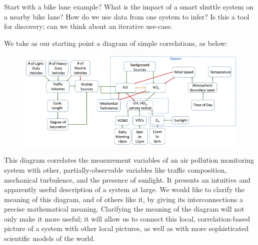 \documentclass{article}
\theoremstyle{definition}
\begin{document}
Start with a bike lane example? What is the impact of a smart shuttle system on a nearby bike lane? How do we use data from one system to infer? Is this a tool for discovery; can we think about an iterative use-case.

We take as our starting point a diagram of simple correlations, as below:

\begin{figure}[h]
\includegraphics[width=\linewidth]{portland}
\end{figure}

This diagram correlates the measurement variables of an air pollution monitoring system with other, partially-observable variables like traffic composition, mechanical turbulence, and the presence of sunlight. It presents an intuitive and apparently useful description of a system at large. We would like to clarify the meaning of this diagram, and of others like it, by giving its interconnections a precise mathematical meaning. Clarifying the meaning of the diagram will not only make it more useful; it will allow us to connect this local, correlation-based picture of a system with other local pictures, as well as with more sophisticated scientific models of the world.


\end{document}
